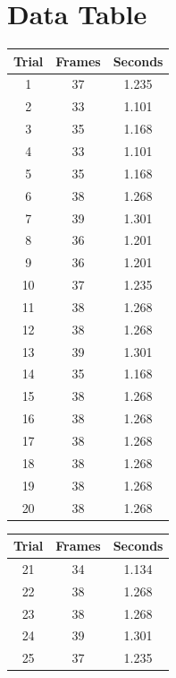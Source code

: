 \documentclass[%
 reprint,
 amsmath,amssymb,
 aps,
]{revtex4-2}
\begin{document}
\section{Data Table}
\begin{table}[h!]
    \centering
    \begin{tabular}{|c|c|c|}
    \hline
    Trial & Frames & Seconds \\ \hline
    1	&37&	1.235 \\ \hline
    2	&33&	1.101 \\ \hline
    3	&35&	1.168 \\ \hline
    4	&33&	1.101 \\ \hline
    5	&35&	1.168 \\ \hline
    6	&38&	1.268 \\ \hline
    7	&39&	1.301 \\ \hline
    8	&36&	1.201 \\ \hline
    9	&36&	1.201 \\ \hline
    10	&37&	1.235 \\ \hline
    11	&38&	1.268 \\ \hline
    12	&38&	1.268 \\ \hline
    13	&39&	1.301 \\ \hline
    14	&35&	1.168 \\ \hline
    15	&38&	1.268 \\ \hline
    16	&38&	1.268 \\ \hline
    17	&38&	1.268 \\ \hline
    18	&38&	1.268 \\ \hline
    19	&38&	1.268 \\ \hline
    20	&38&	1.268 \\ \hline
    \end{tabular}
    \begin{tabular}{|c|c|c|}
        \hline
        Trial & Frames & Seconds \\ \hline
        21	&34&	1.134 \\ \hline
        22	&38&	1.268 \\ \hline
        23	&38&	1.268 \\ \hline
        24	&39&	1.301 \\ \hline
        25	&37&	1.235 \\ \hline

\end{tabular}
\end{table}
\end{document}
